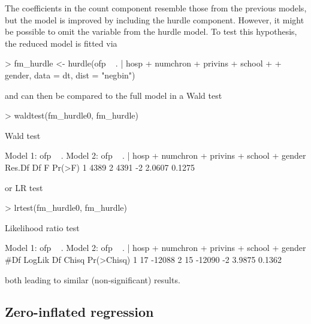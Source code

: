 \documentclass{Z}
\begin{document}
The coefficients in the count component resemble those from the previous
models, but the model is improved by including the hurdle component.
However, it might be possible to omit the  variable from
the hurdle model. To test this hypothesis, the reduced model is fitted
via
\begin{Schunk}
\begin{Sinput}
> fm_hurdle <- hurdle(ofp ~ . | hosp + numchron + privins + school + 
+     gender, data = dt, dist = "negbin")
\end{Sinput}
\end{Schunk}
and can then be compared to the full model in a Wald test
\begin{Schunk}
\begin{Sinput}
> waldtest(fm_hurdle0, fm_hurdle)
\end{Sinput}
\begin{Soutput}
Wald test

Model 1: ofp ~ .
Model 2: ofp ~ . | hosp + numchron + privins + school + gender
  Res.Df   Df      F Pr(>F)
1   4389                   
2   4391   -2 2.0607 0.1275
\end{Soutput}
\end{Schunk}
or LR test
\begin{Schunk}
\begin{Sinput}
> lrtest(fm_hurdle0, fm_hurdle)
\end{Sinput}
\begin{Soutput}
Likelihood ratio test

Model 1: ofp ~ .
Model 2: ofp ~ . | hosp + numchron + privins + school + gender
  #Df LogLik Df  Chisq Pr(>Chisq)
1  17 -12088                     
2  15 -12090 -2 3.9875     0.1362
\end{Soutput}
\end{Schunk}
both leading to similar (non-significant) results.


\subsection{Zero-inflated regression}
\end{document}
